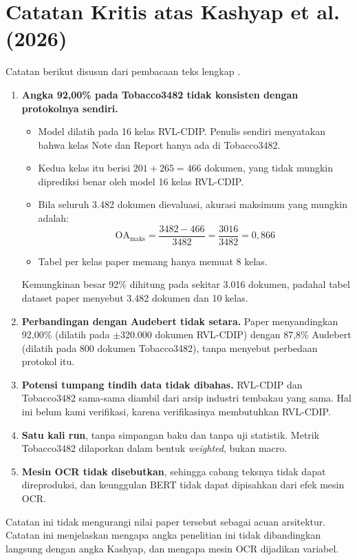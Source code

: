 \chapter{Catatan Kritis atas Kashyap et al. (2026)}\label{lam:kashyap}

Catatan berikut disusun dari pembacaan teks lengkap \textcite{kashyap2026}.

\begin{enumerate}
  \item \textbf{Angka 92,00\% pada Tobacco3482 tidak konsisten dengan protokolnya
  sendiri.}
  \begin{itemize}
    \item Model dilatih pada 16 kelas RVL-CDIP. Penulis sendiri menyatakan bahwa kelas
    Note dan Report hanya ada di Tobacco3482.
    \item Kedua kelas itu berisi $201 + 265 = 466$ dokumen, yang tidak mungkin diprediksi
    benar oleh model 16 kelas RVL-CDIP.
    \item Bila seluruh 3.482 dokumen dievaluasi, akurasi maksimum yang mungkin adalah:
    \begin{equation}\label{eq:kashyap-maks}
      \mathrm{OA}_\text{maks} = \frac{3482 - 466}{3482} = \frac{3016}{3482} = 0{,}866
    \end{equation}
    \item Tabel per kelas paper memang hanya memuat 8 kelas.
  \end{itemize}
  Kemungkinan besar 92\% dihitung pada sekitar 3.016 dokumen, padahal tabel dataset
  paper menyebut 3.482 dokumen dan 10 kelas.
  \item \textbf{Perbandingan dengan Audebert tidak setara.} Paper menyandingkan 92,00\%
  (dilatih pada $\pm$320.000 dokumen RVL-CDIP) dengan 87,8\% Audebert (dilatih pada
  800 dokumen Tobacco3482), tanpa menyebut perbedaan protokol itu.
  \item \textbf{Potensi tumpang tindih data tidak dibahas.} RVL-CDIP dan Tobacco3482
  sama-sama diambil dari arsip industri tembakau yang sama. Hal ini belum kami verifikasi,
  karena verifikasinya membutuhkan RVL-CDIP.
  \item \textbf{Satu kali run}, tanpa simpangan baku dan tanpa uji statistik. Metrik
  Tobacco3482 dilaporkan dalam bentuk \textit{weighted}, bukan macro.
  \item \textbf{Mesin OCR tidak disebutkan}, sehingga cabang teksnya tidak dapat
  direproduksi, dan keunggulan BERT tidak dapat dipisahkan dari efek mesin OCR.
\end{enumerate}

Catatan ini tidak mengurangi nilai paper tersebut sebagai acuan arsitektur. Catatan ini
menjelaskan mengapa angka penelitian ini tidak dibandingkan langsung dengan angka
Kashyap, dan mengapa mesin OCR dijadikan variabel.
